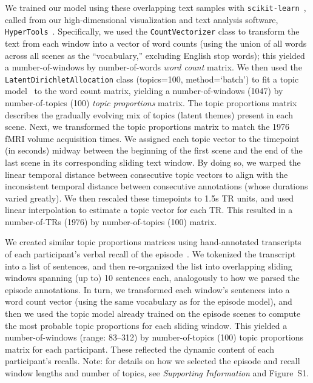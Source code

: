 \documentclass[10pt]{article}
\newcommand{\topicopt}{S1}
\begin{document}
We trained our model using these overlapping text samples with \texttt{scikit-learn}~\citep[version 0.19.1; ][]{PedrEtal11}, called from our high-dimensional visualization and text analysis software, \texttt{HyperTools}~\citep{HeusEtal18a}.  Specifically, we used the \texttt{CountVectorizer} class to transform the text from each window into a vector of word counts (using the union of all words across all scenes as the ``vocabulary,'' excluding English stop words); this yielded a number-of-windows by number-of-words \textit{word count} matrix.  We then used the \texttt{LatentDirichletAllocation} class (topics=100, method=`batch') to fit a topic model~\citep{BleiEtal03} to the word count matrix, yielding a number-of-windows (1047) by number-of-topics (100) \textit{topic proportions} matrix.  The topic proportions matrix describes the gradually evolving mix of topics (latent themes) present in each scene.  Next, we transformed the topic proportions matrix to match the 1976 fMRI volume acquisition times.  We assigned each topic vector to the timepoint (in seconds) midway between the beginning of the first scene and the end of the last scene in its corresponding sliding text window.  By doing so, we warped the linear temporal distance between consecutive topic vectors to align with the inconsistent temporal distance between consecutive annotations (whose durations varied greatly).  We then rescaled these timepoints to 1.5s TR units, and used linear interpolation to estimate a topic vector for each TR.  This resulted in a number-of-TRs (1976) by number-of-topics (100) matrix.

We created similar topic proportions matrices using hand-annotated transcripts of each participant's verbal recall of the episode~\citep[annotated by][]{ChenEtal17}.  We tokenized the transcript into a list of sentences, and then re-organized the list into overlapping sliding windows spanning (up to) 10 sentences each, analogously to how we parsed the episode annotations.  In turn, we transformed each window's sentences into a word count vector (using the same vocabulary as for the episode model), and then we used the topic model already trained on the episode scenes to compute the most probable topic proportions for each sliding window.  This yielded a number-of-windows (range: 83--312) by number-of-topics (100) topic proportions matrix for each participant.  These reflected the dynamic content of each participant's recalls.  Note: for details on how we selected the episode and recall window lengths and number of topics, see \textit{Supporting Information} and Figure~\topicopt.
\end{document}

